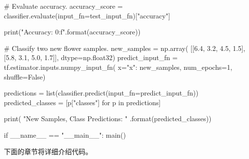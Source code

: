 \begin{python}
  # Evaluate accuracy.
  accuracy_score = classifier.evaluate(input_fn=test_input_fn)["accuracy"]

  print("\nTest Accuracy: {0:f}\n".format(accuracy_score))

  # Classify two new flower samples.
  new_samples = np.array(
      [[6.4, 3.2, 4.5, 1.5],
       [5.8, 3.1, 5.0, 1.7]], dtype=np.float32)
  predict_input_fn = tf.estimator.inputs.numpy_input_fn(
      x={"x": new_samples},
      num_epochs=1,
      shuffle=False)

  predictions = list(classifier.predict(input_fn=predict_input_fn))
  predicted_classes = [p["classes"] for p in predictions]

  print(
      "New Samples, Class Predictions:    {}\n"
      .format(predicted_classes))

if __name__ == "__main__":
    main()
\end{python}
下面的章节将详细介绍代码。
